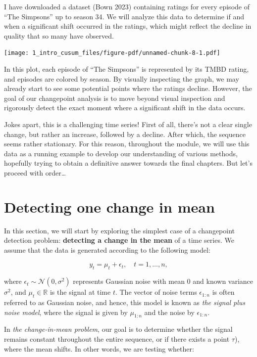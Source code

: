 \documentclass[
  letterpaper,
  DIV=11,
  numbers=noendperiod]{scrreprt}
\begin{document}
I have downloaded a dataset (Bown 2023) containing ratings for every
episode of ``The Simpsons'' up to season 34. We will analyze this data
to determine if and when a significant shift occurred in the ratings,
which might reflect the decline in quality that so many have observed.

\texttt{[image: 1\_intro\_cusum\_files/figure-pdf/unnamed-chunk-8-1.pdf]}

In this plot, each episode of ``The Simpsons'' is represented by its
TMBD rating, and episodes are colored by season. By visually inspecting
the graph, we may already start to see some potential points where the
ratings decline. However, the goal of our changepoint analysis is to
move beyond visual inspection and rigorously detect the exact moment
where a significant shift in the data occurs.

Jokes apart, this is a challenging time series! First of all, there's
not a clear single change, but rather an increase, followed by a
decline. After which, the sequence seems rather stationary. For this
reason, throughout the module, we will use this data as a running
example to develop our understanding of various methods, hopefully
trying to obtain a definitive answer towards the final chapters. But
let's proceed with order\ldots{}

\section{Detecting one change in
mean}\label{detecting-one-change-in-mean}

In this section, we will start by exploring the simplest case of a
changepoint detection problem: \textbf{detecting a change in the mean}
of a time series. We assume that the data is generated according to the
following model:

\[
y_t = \mu_t + \epsilon_t, \quad t = 1, \dots, n,
\]

where \(\epsilon_t \sim \mathcal{N}(0, \sigma^2)\) represents Gaussian
noise with mean 0 and known variance \(\sigma^2\), and
\(\mu_t \in \mathbb{R}\) is the signal at time \(t\). The vector of
noise terms \(\epsilon_{1:n}\) is often referred to as Gaussian noise,
and hence, this model is known as \emph{the signal plus noise model},
where the signal is given by \(\mu_{1:n}\) and the noise by
\(\epsilon_{1:n}\).

In \emph{the change-in-mean problem}, our goal is to determine whether
the signal remains constant throughout the entire sequence, or if there
exists a point \(\tau\)), where the mean shifts. In other words, we are
testing whether:
\end{document}
